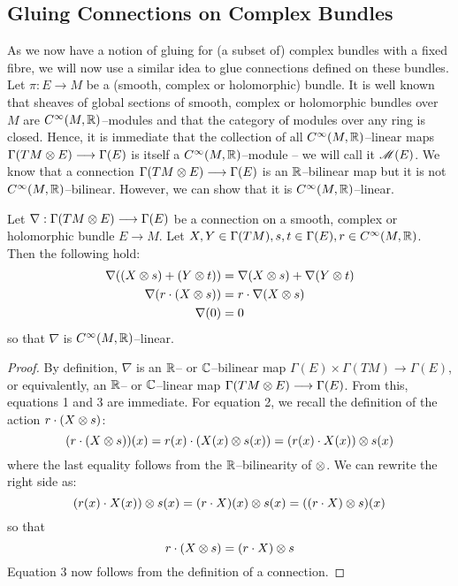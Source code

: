 \documentclass[./Thick_TQFTs_and_Quantum_Information.tex]{subfiles}
\begin{document}
\subsection{Gluing Connections on Complex Bundles}

As we now have a notion of gluing for (a subset of) complex bundles with a fixed
fibre, we will now use a similar idea to glue connections defined on these
bundles. Let $\pi : E \to M$ be a (smooth, complex or holomorphic) bundle. It is
well known that sheaves of global sections of smooth, complex or holomorphic
bundles over $M$ are $C^{\infty}(M, \mathbb{R})$--modules and that the category of
modules over any ring is closed. Hence, it is immediate that the collection of
all $C^{\infty}(M, \mathbb{R})$--linear maps $\Gamma(TM \otimes E) \stackrel{}{\longrightarrow} \Gamma(E)$ is
itself a $C^{\infty}(M, \mathbb{R})$--module -- we will call it $\mathscr{M}(E)$. We
know that a connection $\Gamma(TM \otimes E) \stackrel{}{\longrightarrow} \Gamma(E)$ is an $\mathbb{R}$--bilinear
map but it is not $C^{\infty}(M, \mathbb{R})$--bilinear. However, we can show that it is
$C^{\infty}(M, \mathbb{R})$--linear.

\begin{lem}
Let $\nabla : \Gamma(TM \otimes E) \stackrel{}{\longrightarrow} \Gamma(E)$ be a connection on
a smooth, complex or holomorphic bundle $E \to M$. Let $X, Y \in \Gamma(TM),
s, t \in \Gamma(E), r \in C^{\infty}(M, \mathbb{R})$. Then the following hold:
\begin{align}
  \nabla((X \otimes s) + (Y \otimes t))
    &= \nabla(X \otimes s) + \nabla(Y \otimes t) \\
  \nabla(r \cdot (X \otimes s)) &= r \cdot \nabla(X \otimes s) \\
  \nabla(0) &= 0
\end{align}
so that $\nabla$ is $C^{\infty}(M, \mathbb{R})$--linear.
\end{lem}
\begin{proof}
By definition, $\nabla$ is an $\mathbb{R}$-- or $\mathbb{C}$--bilinear map
$\Gamma(E) \times \Gamma(TM) \to \Gamma(E)$, or equivalently, an $\mathbb{R}$-- or
$\mathbb{C}$--linear map $\Gamma(TM \otimes E) \stackrel{}{\longrightarrow} \Gamma(E)$. From this, equations
1 and 3 are immediate. For equation 2, we recall the definition of the action
$r \cdot (X \otimes s)$:
\[
  (r \cdot (X \otimes s))(x)
    = r(x) \cdot (X(x) \otimes s(x))
    = (r(x) \cdot X(x)) \otimes s(x)
\]
where the last equality follows from the $\mathbb{R}$--bilinearity of $\otimes$. We can
rewrite the right side as:
\[
  (r(x) \cdot X(x)) \otimes s(x)
    = (r \cdot X)(x) \otimes s(x)
    = ((r \cdot X) \otimes s)(x)
\]
so that
\[
  r \cdot (X \otimes s) = (r \cdot X) \otimes s
\]
Equation 3 now follows from the definition of a connection.
\end{proof}
\end{document}
